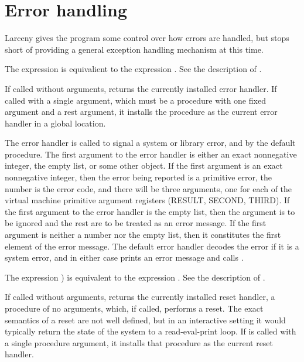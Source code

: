 \section{Error handling}

Larceny gives the program some control over how errors are handled, but
stops short of providing a general exception handling mechanism at this
time.


The expression  is equivalient to 
the expression .  See the
description of .


If called without arguments,  returns the currently
installed error handler.  If called with a single argument, which must be
a procedure with one fixed argument and a rest argument, it installs
the procedure as the current error handler in a global location.

The error handler is called to signal a system or library error, and by
the default  procedure.  The first argument to the error
handler is either an exact nonnegative integer, the empty list, or some
other object.  If the first argument is an exact nonnegative integer,
then the error being reported is a primitive error, the number is the
error code, and there will be three arguments, one for each of the
virtual machine primitive argument registers (RESULT, SECOND, THIRD).
If the first argument to the error handler is the empty list, then the
argument is to be ignored and the rest are to be treated as an error
message.  If the first argument is neither a number nor the empty list,
then it constitutes the first element of the error message.  The default
error handler decodes the error if it is a system error, and in either
case prints an error message and calls .


The expression ) is equivalent to the expression
.  See the description of .


If called without arguments,  returns the currently
installed reset handler, a procedure of no arguments, which, if called,
performs a reset.  The exact semantics of a reset are not well defined,
but in an interactive setting it would typically return the state of the
system to a read-eval-print loop.  If  is called with
a single procedure argument, it installs that procedure as the current
reset handler.

